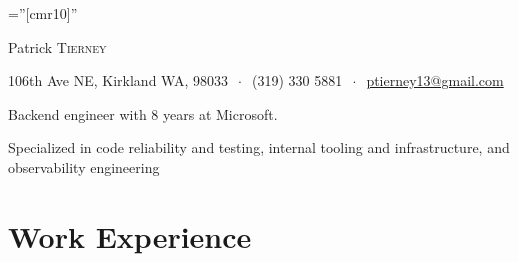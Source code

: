 \documentclass[letterpaper,10pt]{article} %
\begin{document}
\pagestyle{empty} %

\font\fb=''[cmr10]'' %

\begin{center}
{\Huge Patrick \textsc{Tierney}\bigskip }%

\vspace{-5mm}
106th Ave NE, Kirkland WA, 98033  $\ \cdot \ $
 (319) 330 5881 $\ \cdot \ $ 
\href{mailto:ptierney13@gmail.com}{ptierney13@gmail.com}


\vspace{-5mm}
\singlespacing
Backend engineer with 8 years at Microsoft.
\vspace{-2mm}

Specialized in code reliability and testing, internal tooling and infrastructure, and observability engineering

\end{center}





\section{Work Experience}
\end{document}
